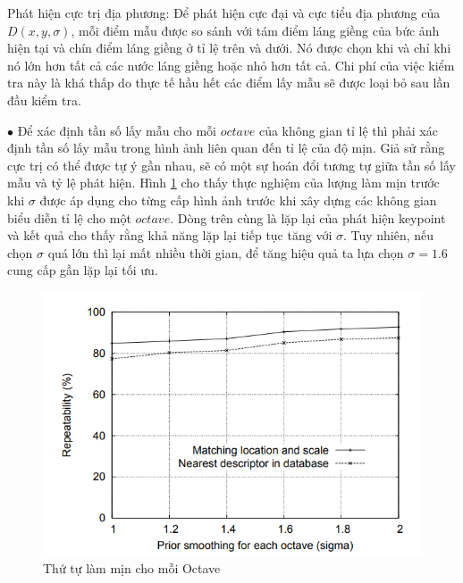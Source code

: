 \documentclass[conference]{IEEEtran}
\begin{document}
Phát hiện cực trị địa phương: Để phát hiện cực đại và cực tiểu địa phương của $D{(x, y, \sigma)}$, mỗi điểm mẫu được so sánh với tám điểm láng giềng của bức ảnh hiện tại và chín điểm láng giềng ở tỉ lệ trên và dưới. Nó được chọn khi và chỉ khi nó lớn hơn tất cả các nước láng giềng hoặc nhỏ hơn tất cả. Chi phí của việc kiểm tra này là khá thấp do thực tế hầu hết các điểm lấy mẫu sẽ được loại bỏ sau lần đầu kiểm tra.

$\bullet$ Để xác định tần số lấy mẫu cho mỗi $octave$ của không gian tỉ lệ thì phải xác định tần số lấy mẫu trong hình ảnh liên quan đến tỉ lệ của độ mịn. Giả sử rằng cực trị có thể được tự ý gần nhau, sẽ có một sự hoán đổi tương tự giữa tần số lấy mẫu và tỷ lệ phát hiện. Hình \ref{fig:thutulammin_phu} cho thấy thực nghiệm của lượng làm mịn trước khi $\sigma$ được áp dụng cho từng cấp hình ảnh trước khi xây dựng các không gian biểu diễn tỉ lệ cho một $octave$. Dòng trên cùng là lặp lại của phát hiện keypoint và kết quả cho thấy rằng khả năng lặp lại tiếp tục tăng với $\sigma$. Tuy nhiên, nếu chọn $\sigma$ quá lớn thì lại mất nhiều thời gian, để tăng hiệu quả ta lựa chọn $\sigma = 1.6$ cung cấp gần lặp lại tối ưu. 

\begin{figure}
  \includegraphics[width=\linewidth]{thutulammin_phu}
  \caption{Thứ tự làm mịn cho mỗi Octave}
  \label{fig:thutulammin_phu}
\end{figure}
\end{document}
